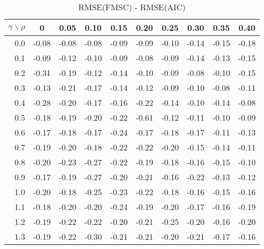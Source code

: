 \documentclass[12pt]{article}
\begin{document}
%
\begin{table}[!tbp]
\caption{RMSE(FMSC) - RMSE(AIC)}
 \begin{center}
 \begin{tabular}{r|rrrrrrrrr}\hline\hline
\multicolumn{1}{c|}{$\gamma\backslash\rho$}&\multicolumn{1}{c}{0}&\multicolumn{1}{c}{0.05}&\multicolumn{1}{c}{0.10}&\multicolumn{1}{c}{0.15}&\multicolumn{1}{c}{0.20}&\multicolumn{1}{c}{0.25}&\multicolumn{1}{c}{0.30}&\multicolumn{1}{c}{0.35}&\multicolumn{1}{c}{0.40}\tabularnewline
\hline

0.0&-0.08&-0.08&-0.08&-0.09&-0.09&-0.10&-0.14&-0.15&-0.18\tabularnewline
0.1&-0.09&-0.12&-0.10&-0.09&-0.08&-0.09&-0.14&-0.13&-0.15\tabularnewline
0.2&-0.31&-0.19&-0.12&-0.14&-0.10&-0.09&-0.08&-0.10&-0.15\tabularnewline
0.3&-0.13&-0.21&-0.17&-0.14&-0.12&-0.09&-0.10&-0.08&-0.11\tabularnewline
0.4&-0.28&-0.20&-0.17&-0.16&-0.22&-0.14&-0.10&-0.14&-0.08\tabularnewline
0.5&-0.18&-0.19&-0.20&-0.22&-0.61&-0.12&-0.11&-0.10&-0.09\tabularnewline
0.6&-0.17&-0.18&-0.17&-0.24&-0.17&-0.18&-0.17&-0.11&-0.13\tabularnewline
0.7&-0.19&-0.20&-0.18&-0.22&-0.22&-0.20&-0.15&-0.14&-0.11\tabularnewline
0.8&-0.20&-0.23&-0.27&-0.22&-0.19&-0.18&-0.16&-0.15&-0.10\tabularnewline
0.9&-0.17&-0.19&-0.27&-0.20&-0.21&-0.16&-0.22&-0.13&-0.12\tabularnewline
1.0&-0.20&-0.18&-0.25&-0.23&-0.22&-0.18&-0.16&-0.15&-0.16\tabularnewline
1.1&-0.18&-0.20&-0.20&-0.24&-0.19&-0.20&-0.17&-0.16&-0.19\tabularnewline
1.2&-0.19&-0.22&-0.22&-0.20&-0.21&-0.25&-0.20&-0.16&-0.20\tabularnewline
1.3&-0.19&-0.22&-0.30&-0.21&-0.21&-0.20&-0.21&-0.17&-0.16\tabularnewline
\hline
\end{tabular}

\end{center}

\end{table}
\end{document}
